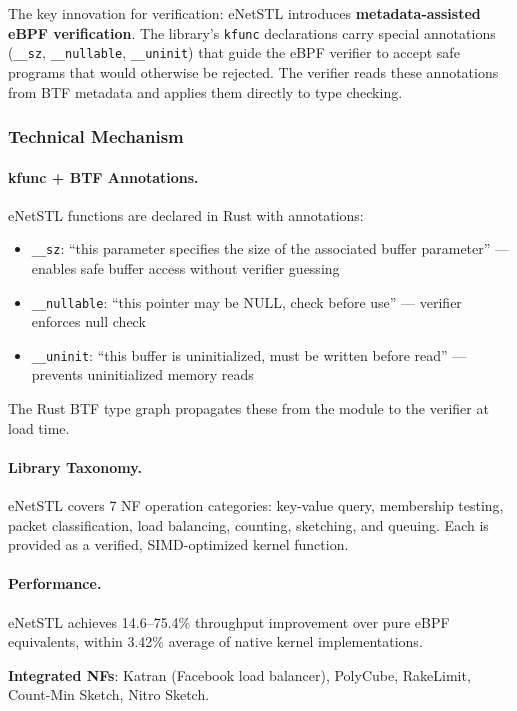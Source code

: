 The key innovation for verification: eNetSTL introduces \textbf{metadata-assisted eBPF verification}. The library's \texttt{kfunc} declarations carry special annotations (\texttt{\_\_sz}, \texttt{\_\_nullable}, \texttt{\_\_uninit}) that guide the eBPF verifier to accept safe programs that would otherwise be rejected. The verifier reads these annotations from BTF metadata and applies them directly to type checking.

\subsubsection{Technical Mechanism}

\paragraph{kfunc + BTF Annotations.}
eNetSTL functions are declared in Rust with annotations:
\begin{itemize}
  \item \texttt{\_\_sz}: ``this parameter specifies the size of the associated buffer parameter'' --- enables safe buffer access without verifier guessing
  \item \texttt{\_\_nullable}: ``this pointer may be NULL, check before use'' --- verifier enforces null check
  \item \texttt{\_\_uninit}: ``this buffer is uninitialized, must be written before read'' --- prevents uninitialized memory reads
\end{itemize}
The Rust BTF type graph propagates these from the module to the verifier at load time.

\paragraph{Library Taxonomy.}
eNetSTL covers 7 NF operation categories:
key-value query, membership testing, packet classification, load balancing, counting, sketching, and queuing. Each is provided as a verified, SIMD-optimized kernel function.

\paragraph{Performance.}
eNetSTL achieves 14.6--75.4\% throughput improvement over pure eBPF equivalents, within 3.42\% average of native kernel implementations.

\textbf{Integrated NFs}: Katran (Facebook load balancer), PolyCube, RakeLimit, Count-Min Sketch, Nitro Sketch.

